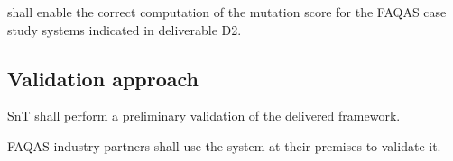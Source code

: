  \RQ{} \FAQAS shall enable the correct computation of the mutation score for the FAQAS case study systems indicated in deliverable D2.
 
 \subsection{Validation approach}

\RQ{} SnT shall perform a preliminary validation of the delivered framework.

\RQ{} FAQAS industry partners shall use the system at their premises to validate it.

%  
% 
%
% 
% 

% 

